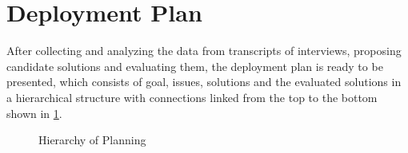 
\section{Deployment Plan}

After collecting and analyzing the data from transcripts of interviews, proposing candidate solutions and evaluating them, the deployment plan is ready to be presented, which consists of goal, issues, solutions and the evaluated solutions in a hierarchical structure with connections linked from the top to the bottom shown in \ref{img:hier}.

\begin{figure}[ht]
\centering
\caption{Hierarchy of Planning}
\label{img:hier}
\end{figure}




